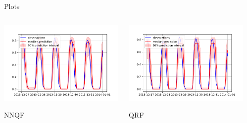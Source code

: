 \documentclass[10pt,aspectratio=169]{beamer}
\begin{document}
\begin{frame}{Plots}
    \begin{columns}
        \begin{column}{0.33\textwidth}
            \includegraphics[width=\textwidth]{plots/nnqf_plot_9.pdf}
            \begin{center}
                NNQF
            \end{center}
        \end{column}
        \begin{column}{0.33\textwidth}
            \includegraphics[width=\textwidth]{plots/qrf_plot_9.pdf}
            \begin{center}
                QRF
            \end{center}
        \end{column}
        \begin{column}{0.33\textwidth}

\end{column}
\end{columns}
\end{frame}
\end{document}
